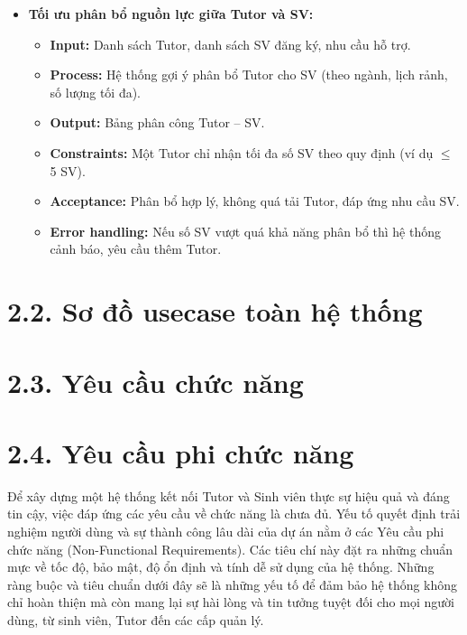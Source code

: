 \begin{itemize}
    \item \textbf{Tối ưu phân bổ nguồn lực giữa Tutor và SV:}
    \begin{itemize}
        \item \textbf{Input:} Danh sách Tutor, danh sách SV đăng ký, nhu cầu hỗ trợ.
        \item \textbf{Process:} Hệ thống gợi ý phân bổ Tutor cho SV (theo ngành, lịch rảnh, số lượng tối đa).
        \item \textbf{Output:} Bảng phân công Tutor – SV.
        \item \textbf{Constraints:} Một Tutor chỉ nhận tối đa số SV theo quy định (ví dụ $\leq$ 5 SV).
        \item \textbf{Acceptance:} Phân bổ hợp lý, không quá tải Tutor, đáp ứng nhu cầu SV.
        \item \textbf{Error handling:} Nếu số SV vượt quá khả năng phân bổ thì hệ thống cảnh báo, yêu cầu thêm Tutor.
    \end{itemize}
\end{itemize}



\section*{2.2. Sơ đồ usecase toàn hệ thống}



\section*{2.3. Yêu cầu chức năng}



\section*{2.4. Yêu cầu phi chức năng}
Để xây dựng một hệ thống kết nối Tutor và Sinh viên thực sự hiệu quả và đáng tin cậy, việc đáp ứng các yêu cầu về chức năng là chưa đủ. Yếu tố quyết định trải nghiệm người dùng và sự thành công lâu dài của dự án nằm ở các Yêu cầu phi chức năng (Non-Functional Requirements). Các tiêu chí này đặt ra những chuẩn mực về tốc độ, bảo mật, độ ổn định và tính dễ sử dụng của hệ thống. Những ràng buộc và tiêu chuẩn dưới đây sẽ là những yếu tố để đảm bảo hệ thống không chỉ hoàn thiện mà còn mang lại sự hài lòng và tin tưởng tuyệt đối cho mọi người dùng, từ sinh viên, Tutor đến các cấp quản lý.

